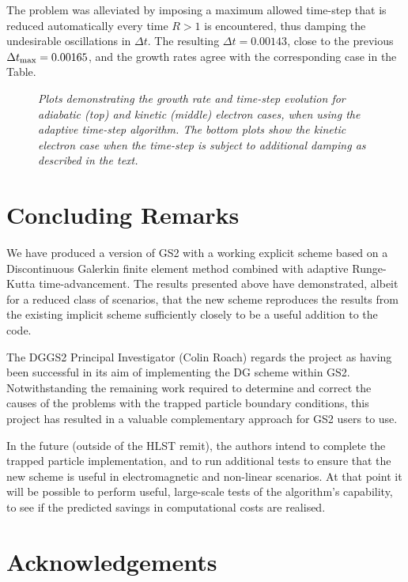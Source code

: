 \documentclass[10pt,a4paper]{article}
\begin{document}
The problem was alleviated by imposing a maximum allowed time-step that is
reduced automatically every time $R > 1$ is encountered, thus damping the
undesirable oscillations in $\Delta t$. The resulting $\Delta t = 0.00143$,
close to the previous $\Delta t_{\mbox{\scriptsize max}} = 0.00165$, and the
growth rates agree with the corresponding case in the Table.

\begin{figure}[!p]
  \begin{center}
  \end{center}
  \caption{\textit{Plots demonstrating the growth rate and time-step evolution for
    adiabatic (top) and kinetic (middle) electron cases, when using the adaptive
    time-step algorithm. The bottom plots show the kinetic electron case when
    the time-step is subject to additional damping as described in the text.}
  \label{fig:adaptivedt2} }
\end{figure}


\section{Concluding Remarks}

We have produced a version of GS2 with a working explicit scheme based on a
Discontinuous Galerkin finite element method combined with adaptive
Runge-Kutta time-advancement. The results presented above have demonstrated,
albeit for a reduced class of scenarios, that the new scheme reproduces the
results from the existing implicit scheme sufficiently closely to be a useful
addition to the code.

The DGGS2 Principal Investigator (Colin Roach) regards the project as having
been successful in its aim of implementing the DG scheme within GS2.
Notwithstanding the remaining work required to determine and correct the
causes of the problems with the trapped particle boundary conditions, this
project has resulted in a valuable complementary approach for GS2 users to
use.

In the future (outside of the HLST remit), the authors intend to complete the
trapped particle implementation, and to run additional tests to ensure that
the new scheme is useful in electromagnetic and non-linear scenarios. At that
point it will be possible to perform useful, large-scale tests of the
algorithm's capability, to see if the predicted savings in computational costs
are realised.

\section*{Acknowledgements}
\end{document}
